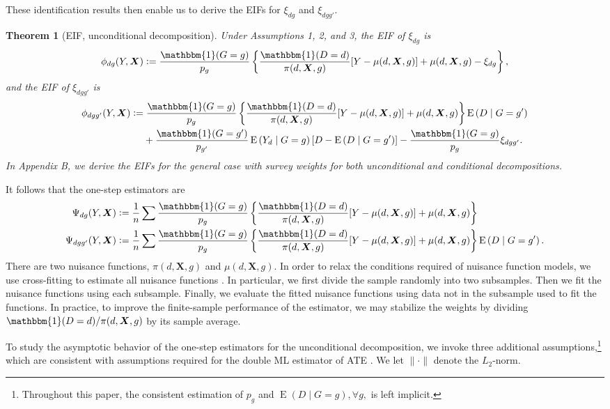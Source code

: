 \documentclass[12pt,a4paper]{article}
\newtheorem{prop}{Theorem}
\newcommand{\E}{\operatorname{E}}
\def\X{{\boldsymbol X}}
\def\one{\mathbbm{1}}
\newcommand{\defeq}{\vcentcolon=}
\begin{document}
These identification results then enable us to derive the EIFs for $\xi_{dg}$ and $\xi_{dgg'}$.
\begin{prop}[EIF, unconditional decomposition]
Under Assumptions 1, 2, and 3, the EIF of $\xi_{dg}$ is
$$\phi_{dg}(Y,\X) \defeq \frac{\one(G=g)}{p_g} \left\{ \frac{\one(D=d)}{\pi(d, \X,g)} [Y-\mu(d,\X,g)] + \mu(d,\X,g) - \xi_{dg} \right\},$$ 
and the EIF of $\xi_{dgg'}$ is
\begin{align*}
    \phi_{dgg'}(Y,\X) &\defeq \frac{\one(G=g)}{p_g}  \left\{\frac{\one(D=d)}{\pi(d,\X,g)}[Y-\mu(d,\X,g)] + \mu(d,\X,g) \right\} \E \left(D \mid G=g' \right) \\
    &\phantom{{}={}} + \frac{\one(G=g')}{p_{g'}} \E \left(Y_d \mid G=g \right) \left[D - \E \left(D \mid G=g' \right) \right] - \frac{\one(G=g)}{p_g} \xi_{dgg'}.
\end{align*}
In Appendix B, we derive the EIFs for the general case with survey weights for both unconditional and conditional decompositions. 
\end{prop}
It follows that the one-step estimators are
\begin{align*}
    \Psi_{dg}(Y,\X) &\defeq \frac{1}{n} \sum \frac{\one(G=g)}{p_g} \left\{ \frac{\one(D=d)}{\pi(d, \X,g)} [Y-\mu(d,\X,g)] + \mu(d,\X,g)\right\} \\
    \Psi_{dgg'}(Y,\X) &\defeq \frac{1}{n} \sum \frac{\one(G=g)}{p_g}  \left\{\frac{\one(D=d)}{\pi(d,\X,g)}[Y-\mu(d,\X,g)] + \mu(d,\X,g) \right\} \E \left(D \mid G=g' \right).
\end{align*}
There are two nuisance functions, $\pi(d,\X,g)$ and $\mu(d,\X,g)$. In order to relax the conditions required of nuisance function models, we use cross-fitting to estimate all nuisance functions \citep{kennedy_semiparametric_2022, chernozhukov_double/debiased_2018}. In particular, we first divide the sample randomly into two subsamples. Then we fit the nuisance functions using each subsample. Finally, we evaluate the fitted nuisance functions using data not in the subsample used to fit the functions. In practice, to improve the finite-sample performance of the estimator, we may stabilize the weights by dividing $\one(D=d)/\pi(d,\X,g)$ by its sample average.  

To study the asymptotic behavior of the one-step estimators for the unconditional decomposition, we invoke three additional assumptions,\footnote{Throughout this paper, the consistent estimation of $p_g$ and $\E(D \mid G=g), \forall g,$ is left implicit.} which are consistent with assumptions required for the double ML estimator of ATE \citep{kennedy_semiparametric_2022, chernozhukov_double/debiased_2018}. We let $\| \cdot \|$ denote the $L_2$-norm. 
\end{document}
